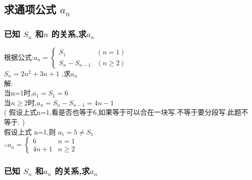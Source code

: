 \documentclass[hyperref, UTF8,11pt,a4paper]{ctexart} %
\begin{document}
\subsection{求通项公式 \texorpdfstring{$a_{n}$}{Lg}}

\subsubsection{已知 \texorpdfstring{$S_{n}$}{Lg} 和\texorpdfstring{$n$}{Lg} 的关系,求\texorpdfstring{$a_{n}$}{Lg}   }
{\color{blue} 根据公式:$a_{n}=\left\{\begin{array}{ll}{S_{1}} & {(n=1)} \\ {S_{n}-S_{n-1}} & {(n \geqslant 2)}\end{array}\right.$ } \\
{\color{red}  $S_{n}=2 n^{2}+3 n+1$ ,求$a_{n}$} \\
解: \\
当n=1时,$a_{1}=S_{1}=6$ \\
当$n \geqslant 2$时,$a_{n}=S_{n}-S_{n-1}=4 n-1$ \\
({ \color{blue} 假设上式n=1,看是否也等于6,如果等于可以合在一块写.不等于要分段写.此题不等于. })\\
假设上式 n=1,则 $a_{1}=5\neq S_{1}$ \\
$ \therefore a_{n}=\left\{\begin{array}{ll}{6} & {n=1} \\ {4 n+1} & {n \geqslant 2}\end{array}\right.$
\subsubsection{已知 \texorpdfstring{$S_{n}$}{Lg} 和\texorpdfstring{$a_{n}$}{Lg} 的关系,求\texorpdfstring{$a_{n}$}{Lg}   }

\end{document}
